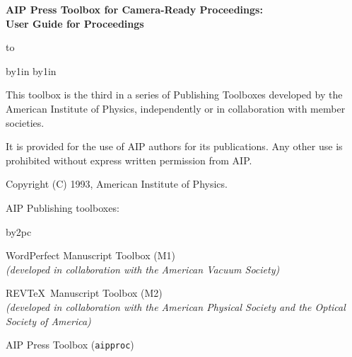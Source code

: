\flushbottom


\makeatother

\flushbottom

\sloppy		

\begin{titlepage}
\vspace*{0pt plus1fill}
\begin{center}
\LARGE\bf
AIP Press Toolbox for Camera-Ready Proceedings:\\[1pc]
User Guide for Proceedings
\end{center}
\vspace*{0pt plus1fill}
\vspace*{0pt plus1fill}
\hbox to
\end{titlepage}

\newpage

\bgroup
\large \parindent0pt \advance\leftskip by1in \advance\rightskip by1in

This toolbox is the third in a series of Publishing Toolboxes developed
by the American Institute of Physics, independently or in collaboration with
member societies.

\vspace{1pc}

It is provided for the use of AIP authors for its publications. Any other
use is prohibited without express written permission from AIP.

\vspace{1pc}

Copyright (C) 1993, American Institute of Physics.


\vspace{0pt plus 1fill}

AIP Publishing toolboxes:

\vspace{1pc}

{\advance\leftskip by2pc

WordPerfect Manuscript Toolbox (M1)\\
{\it (developed in collaboration with the American Vacuum Society)}

REV\TeX\ Manuscript Toolbox (M2)\\
{\it (developed in collaboration with the American Physical Society and
the Optical Society of America)}

AIP Press Toolbox (\verb+aipproc+)\\

}

